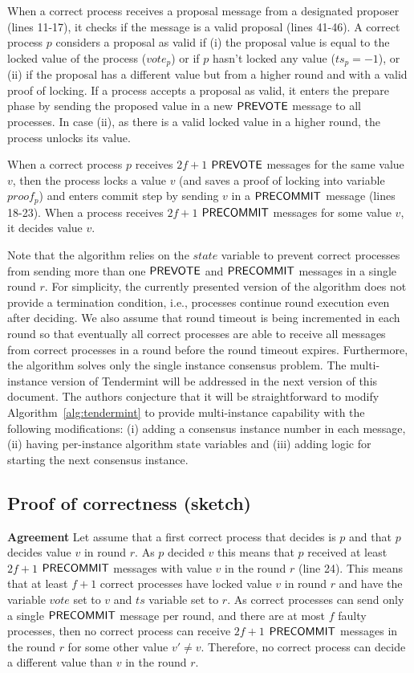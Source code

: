 When a correct process receives a proposal message from a designated proposer (lines 11-17), it checks if the message is a valid proposal (lines 41-46). A correct process $p$ considers a proposal as valid if (i) the proposal value is equal to the locked value of the process ($vote_p$) or if $p$ hasn't locked any value ($ts_p = -1$), or (ii) if the proposal has a different value but from a higher round and with a valid proof of locking. If a process accepts a proposal as valid, it enters the prepare phase by sending the proposed value in a new $\mathsf{PREVOTE}$ message to all processes. In case (ii), as there is a valid locked value in a higher round, the process unlocks its value.  

When a correct process $p$ receives $2f+1$ $\mathsf{PREVOTE}$ messages for the same value $v$, then the process locks a value $v$ (and saves a proof of locking into variable $proof_p$) and enters commit step by sending $v$ in a $\mathsf{PRECOMMIT}$   message (lines 18-23). When a process receives $2f+1$ $\mathsf{PRECOMMIT}$   messages for some value $v$, it decides value $v$. 

Note that the algorithm relies on the $state$ variable to prevent correct processes from sending more than one $\mathsf{PREVOTE}$ and $\mathsf{PRECOMMIT}$ messages in a single round $r$. For simplicity, the currently presented version of the algorithm does not provide a termination condition, i.e., processes continue round execution even after deciding. We also assume that round timeout is being incremented in each round so that eventually all correct processes are able to receive all messages from correct processes in a round before the round timeout expires.  
Furthermore, the algorithm solves only the single instance consensus problem. The multi-instance version of Tendermint will be addressed in the next version of this document. The authors conjecture that it will be straightforward to modify Algorithm~\ref{alg:tendermint} to provide multi-instance capability with the following modifications: (i) adding a consensus instance number in each message, (ii) having per-instance algorithm state variables and (iii) adding logic for starting the next consensus instance.

\subsection{Proof of correctness (sketch)}

\textbf{Agreement} Let assume that a first correct process that decides is $p$ and that $p$ decides value $v$ in round $r$. As $p$ decided $v$ this means that $p$ received at least $2f+1$ $\mathsf{PRECOMMIT}$  messages with value $v$ in the round $r$ (line 24). This means that at least $f+1$ correct processes have locked value $v$ in round $r$ and have the variable $vote$ set to $v$ and $ts$ variable set to $r$. As correct processes can send only a single $\mathsf{PRECOMMIT}$  message per round, and there are at most $f$ faulty processes, then no correct process can receive $2f+1$ $\mathsf{PRECOMMIT}$  messages in the round $r$ for some other value $v' \neq v$. Therefore, no correct process can decide a different value than $v$ in the round $r$. 


